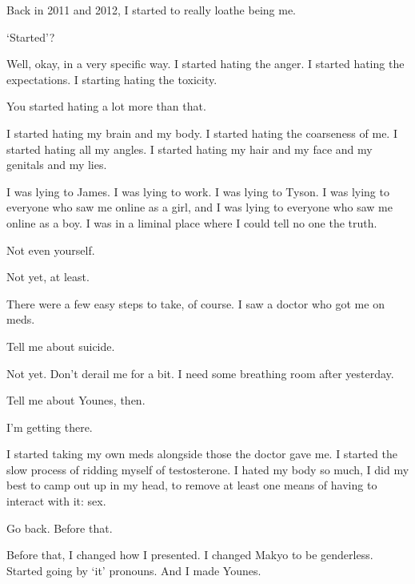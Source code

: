 \label{furry:younes}
\begin{paracol}{2}
  \begin{leftcolumn}

\noindent Back in 2011 and 2012, I started to really loathe being me.

\begin{ally}
`Started'?
\end{ally}
Well, okay, in a very specific way. I started hating the anger. I started hating the expectations. I starting hating the toxicity.

\begin{ally}
You started hating a lot more than that.
\end{ally}
I started hating my brain and my body. I started hating the coarseness of me. I started hating all my angles. I started hating my hair and my face and my genitals and my lies.

I was lying to James. I was lying to work. I was lying to Tyson. I was lying to everyone who saw me online as a girl, and I was lying to everyone who saw me online as a boy. I was in a liminal place where I could tell no one the truth.

\begin{ally}
Not even yourself.
\end{ally}
Not yet, at least.

There were a few easy steps to take, of course. I saw a doctor who got me on meds.

\begin{ally}
Tell me about suicide.
\end{ally}
Not yet. Don't derail me for a bit. I need some breathing room after yesterday.

\begin{ally}
Tell me about Younes, then.
\end{ally}
I'm getting there.

I started taking my own meds alongside those the doctor gave me. I started the slow process of ridding myself of testosterone. I hated my body so much, I did my best to camp out up in my head, to remove at least one means of having to interact with it: sex.

\begin{ally}
Go back. Before that.
\end{ally}
Before that, I changed how I presented. I changed Makyo to be genderless. Started going by `it' pronouns. And I made Younes.


\end{leftcolumn}
\end{paracol}
